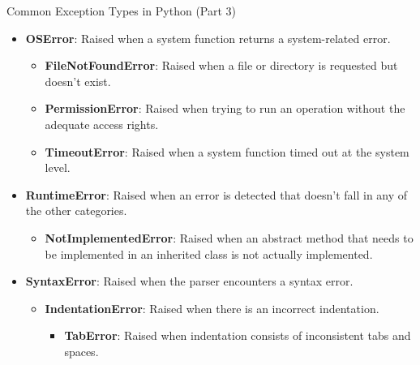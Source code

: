 \begin{frame}{Common Exception Types in Python (Part 3)}
    \begin{itemize}
        \item \textbf{OSError}: Raised when a system function returns a system-related error.
            \begin{itemize}
                \item \textbf{FileNotFoundError}: Raised when a file or directory is requested but doesn't exist.
                \item \textbf{PermissionError}: Raised when trying to run an operation without the adequate access rights.
                \item \textbf{TimeoutError}: Raised when a system function timed out at the system level.
            \end{itemize}
        \item \textbf{RuntimeError}: Raised when an error is detected that doesn't fall in any of the other categories.
            \begin{itemize}
                \item \textbf{NotImplementedError}: Raised when an abstract method that needs to be implemented in an inherited class is not actually implemented.
            \end{itemize}
        \item \textbf{SyntaxError}: Raised when the parser encounters a syntax error.
            \begin{itemize}
                \item \textbf{IndentationError}: Raised when there is an incorrect indentation.
                    \begin{itemize}
                        \item \textbf{TabError}: Raised when indentation consists of inconsistent tabs and spaces.
                    \end{itemize}
            \end{itemize}
    \end{itemize}
\end{frame}

